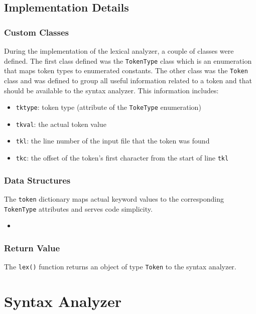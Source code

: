 \documentclass{article}
\newcommand{\pythonscript}[2]{
\begin{itemize}
\item[]
\end{itemize}
}
\def\code#1{\texttt{#1}} %
\begin{document}
\pagebreak

\subsection{Implementation Details}

\subsubsection{Custom Classes}
During the implementation of the lexical analyzer, a couple of classes were defined.
The first class defined was the \code{TokenType} class which is an enumeration that maps token
types to enumerated constants. The other class was the \code{Token} class and was defined to group
all useful information related to a token and that should be available to the syntax analyzer. 
This information includes:
\begin{itemize}
 \item \code{tktype}: token type (attribute of the \code{TokeType} enumeration)
 \item \code{tkval}: the actual token value
 \item \code{tkl}: the line number of the input file that the token was found
 \item \code{tkc}: the offset of the token's first character from the start of line \code{tkl}
\end{itemize}


\subsubsection{Data Structures}
The \code{token} dictionary maps actual keyword values to the corresponding \code{TokenType} 
attributes and serves code simplicity.
\pythonscript{token-dict}{Token type/value dictionary}

\subsubsection{Return Value}
The \code{lex()} function returns an object of type \code{Token} to the syntax analyzer.


\section{Syntax Analyzer}
\end{document}

